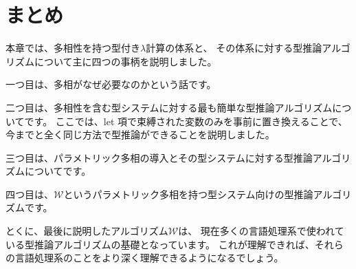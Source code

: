 \section{まとめ}

本章では、多相性を持つ型付き$\lambda$計算の体系と、
その体系に対する型推論アルゴリズムについて主に四つの事柄を説明しました。

一つ目は、多相がなぜ必要なのかという話です。

二つ目は、多相性を含む型システムに対する最も簡単な型推論アルゴリズムについてです。
ここでは、let 項で束縛された変数のみを事前に置き換えることで、
今までと全く同じ方法で型推論ができることを説明しました。

三つ目は、パラメトリック多相の導入とその型システムに対する型推論アルゴリズムについてです。

四つ目は、$\mathcal W$というパラメトリック多相を持つ型システム向けの型推論アルゴリズムです。

とくに、最後に説明したアルゴリズム$\mathcal W$は、
現在多くの言語処理系で使われている型推論アルゴリズムの基礎となっています。
これが理解できれば、それらの言語処理系のことをより深く理解できるようになるでしょう。

